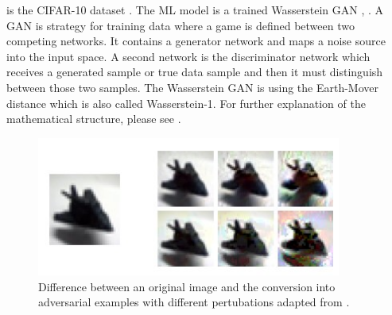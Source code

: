 is the CIFAR-10 dataset \cite{Krizhevsky2009LearningML}. The ML model is a trained Wasserstein GAN \cite{DBLP:journals/corr/ArjovskyCB17}, \cite{DBLP:conf/nips/GulrajaniAADC17}. A GAN is strategy for training data where a game is defined between two competing networks. It contains a generator network and maps a noise source into the input space. A second network is the discriminator network which receives a generated sample or true data sample and then it must distinguish between those two samples. The Wasserstein GAN is using the Earth-Mover distance which is also called Wasserstein-1. For
further explanation of the mathematical structure, please see \cite{DBLP:journals/corr/GulrajaniAADC17}.

\begin{figure}[ht!]
  \centering
  \includegraphics[width=10cm]{pictures/poisoned_clean_label.jpg}
  \caption{Difference between an original image and the conversion into adversarial examples with different pertubations adapted from \cite{turner2018clean}.}
  \label{fig:poisoned_clean_label}
\end{figure}

